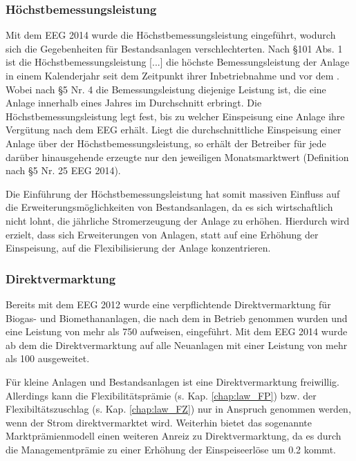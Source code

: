 \subsubsection{Höchstbemessungsleistung}\label{chap:law_Bem}

Mit dem \gls{EEG} \SI{2014}{\relax} wurde die Höchstbemessungsleistung eingeführt, wodurch sich die Gegebenheiten für Bestandsanlagen verschlechterten. Nach \S 101 Abs. 1 ist die \glqq Höchstbemessungsleistung [...] die höchste Bemessungsleistung der Anlage in einem Kalenderjahr seit dem Zeitpunkt ihrer Inbetriebnahme und vor dem .\grqq{} Wobei nach \S 5 Nr. 4 die Bemessungsleistung diejenige Leistung ist, die eine Anlage innerhalb eines Jahres im Durchschnitt erbringt. \parencite{BJV2014a} Die Höchstbemessungsleistung legt fest, bis zu welcher Einspeisung eine Anlage ihre Vergütung nach dem \gls{EEG} erhält. Liegt die durchschnittliche Einspeisung einer Anlage über der Höchstbemessungsleistung, so erhält der Betreiber für jede darüber hinausgehende erzeugte \si{\kwh} nur den jeweiligen Monatsmarktwert (Definition nach \S 5 Nr. 25 \gls{EEG} 2014). \parencite{Loibl2014}\smallskip

Die Einführung der Höchstbemessungsleistung hat somit massiven Einfluss auf die Erweiterungsmöglichkeiten von Bestandsanlagen, da es sich wirtschaftlich nicht lohnt, die jährliche Stromerzeugung der Anlage zu erhöhen. Hierdurch wird erzielt, dass sich Erweiterungen von Anlagen, statt auf eine Erhöhung der Einspeisung, auf die Flexibilisierung der Anlage konzentrieren. \parencite{DanielGromke2019}


\subsubsection{Direktvermarktung}\label{chap:law_DV}

Bereits mit dem \gls{EEG} \SI{2012}{\relax} wurde eine verpflichtende Direktvermarktung für Biogas- und Biomethananlagen, die nach dem  in Betrieb genommen wurden und eine Leistung von mehr als \SI{750}{\kw} aufweisen, eingeführt. Mit dem \gls{EEG} \SI{2014}{\relax} wurde ab dem  die Direktvermarktung auf alle Neuanlagen mit einer Leistung von mehr als \SI{100}{\kw} ausgeweitet.\smallskip

Für kleine Anlagen und Bestandsanlagen ist eine Direktvermarktung freiwillig. Allerdings kann die Flexibilitätsprämie (s. Kap. \ref{chap:law_FP}) bzw. der Flexibiltätszuschlag (s. Kap. \ref{chap:law_FZ}) nur in Anspruch genommen werden, wenn der Strom direktvermarktet wird. Weiterhin bietet das sogenannte Marktprämienmodell einen weiteren Anreiz zu Direktvermarktung, da es durch die Managementprämie zu einer Erhöhung der Einspeiseerlöse um \SI[per-mode=symbol]{0.2}{\ctkwh} kommt.\smallskip

